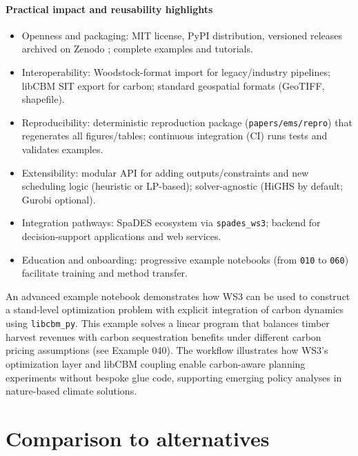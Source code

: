 \documentclass[review]{elsarticle}
\begin{document}
\paragraph{Practical impact and reusability highlights}
\begin{itemize}
  \item Openness and packaging: MIT license, PyPI distribution, versioned releases archived on Zenodo \citep{ws3_zenodo2025}; complete examples and tutorials.
  \item Interoperability: Woodstock-format import for legacy/industry pipelines; libCBM SIT export for carbon; standard geospatial formats (GeoTIFF, shapefile).
  \item Reproducibility: deterministic reproduction package (\texttt{papers/ems/repro}) that regenerates all figures/tables; continuous integration (CI) runs tests and validates examples.
  \item Extensibility: modular API for adding outputs/constraints and new scheduling logic (heuristic or LP-based); solver-agnostic (HiGHS by default; Gurobi optional).
  \item Integration pathways: SpaDES ecosystem via \texttt{spades\_ws3}; backend for decision-support applications and web services.
  \item Education and onboarding: progressive example notebooks (from \texttt{010} to \texttt{060}) facilitate training and method transfer.
\end{itemize}

An advanced example notebook demonstrates how WS3 can be used to construct a stand-level optimization problem with explicit integration of carbon dynamics using \texttt{libcbm\_py}. This example solves a linear program that balances timber harvest revenues with carbon sequestration benefits under different carbon pricing assumptions (see Example 040). The workflow illustrates how WS3’s optimization layer and libCBM coupling enable carbon-aware planning experiments without bespoke glue code, supporting emerging policy analyses in nature-based climate solutions.

\section{Comparison to alternatives}
\end{document}
